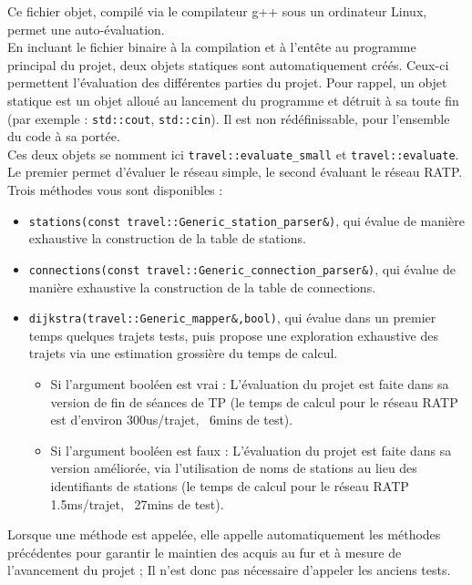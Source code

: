 \documentclass[9pts]{article}
\begin{document}
Ce fichier objet, compilé via le compilateur g++ sous un ordinateur Linux, permet une auto-évaluation.\\

En incluant le fichier binaire à la compilation et à l'entête au programme principal du projet, deux objets statiques sont automatiquement créés. Ceux-ci permettent l'évaluation des différentes parties du projet.
Pour rappel, un objet statique est un objet alloué au lancement du programme et détruit à sa toute fin (par exemple : \texttt{std::cout}, \texttt{std::cin}). Il est non rédéfinissable, pour l'ensemble du code à sa portée.\\

Ces deux objets se nomment ici \texttt{travel::evaluate\_small} et \texttt{travel::evaluate}. Le premier permet d'évaluer le réseau simple, le second évaluant le réseau RATP.\\

Trois méthodes vous sont disponibles :
\begin{itemize}
  \item \texttt{stations(const travel::Generic\_station\_parser\&)}, qui évalue de manière exhaustive la construction de la table de stations.
  \item \texttt{connections(const travel::Generic\_connection\_parser\&)}, qui évalue de manière exhaustive la construction de la table de connections.
  \item \texttt{dijkstra(travel::Generic\_mapper\&,bool)}, qui évalue dans un premier temps quelques trajets tests, puis propose une exploration exhaustive des trajets via une estimation grossière du temps de calcul.
    \begin{itemize}
      \item Si l'argument booléen est vrai : L'évaluation du projet est faite dans sa version de fin de séances de TP (le temps de calcul pour le réseau RATP est d'environ 300us/trajet, ~6mins de test).
      \item Si l'argument booléen est faux : L'évaluation du projet est faite dans sa version améliorée, via l'utilisation de noms de stations au lieu des identifiants de stations (le temps de calcul pour le réseau RATP 1.5ms/trajet, ~27mins de test).
    \end{itemize}
\end{itemize}
Lorsque une méthode est appelée, elle appelle automatiquement les méthodes précédentes pour garantir le maintien des acquis au fur et à mesure de l'avancement du projet ; Il n'est donc pas nécessaire d'appeler les anciens tests.\\
\end{document}
